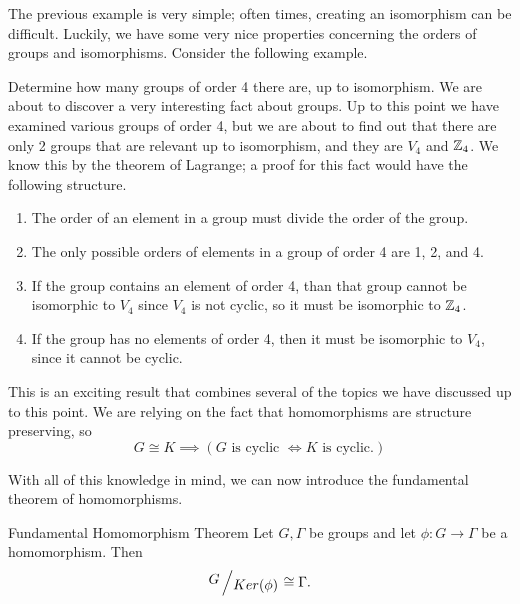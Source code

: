 The previous example is very simple; often times, creating an isomorphism can be difficult.
Luckily, we have some very nice properties concerning the orders of groups and isomorphisms.
Consider the following example.

\begin{example}{Determine how many groups of order 4 there are, up to isomorphism.}
    We are about to discover a very interesting fact about groups.
    Up to this point we have examined various groups of order 4, but we are about to find out that there are only 2 groups that are relevant up to isomorphism, and they are $V_{4}$ and $\mathbb{Z}_{4}$.
    We know this by the theorem of Lagrange; a proof for this fact would have the following structure.
    \begin{enumerate}
        \item The order of an element in a group must divide the order of the group.
        \item The only possible orders of elements in a group of order 4 are 1, 2, and 4.
        \item If the group contains an element of order 4, than that group cannot be isomorphic to $V_{4}$ since $V_{4}$ is not cyclic, so it must be isomorphic to $\mathbb{Z}_{4}$.
        \item If the group has no elements of order 4, then it must be isomorphic to $V_{4}$, since it cannot be cyclic.
    \end{enumerate}
    This is an exciting result that combines several of the topics we have discussed up to this point.
    We are relying on the fact that homomorphisms are structure preserving, so
    \[
        G\cong K \implies (G\text{ is cyclic }\iff K\text{ is cyclic.})
    \]
\end{example}

With all of this knowledge in mind, we can now introduce the fundamental theorem of homomorphisms.

\begin{theorem}{Fundamental Homomorphism Theorem}
    Let $G, \Gamma$ be groups and let $\phi : G\to\Gamma$ be a homomorphism. Then
    \[
        \fgroup{G}{Ker(\phi)}\cong\Gamma.
    \]
\end{theorem}
